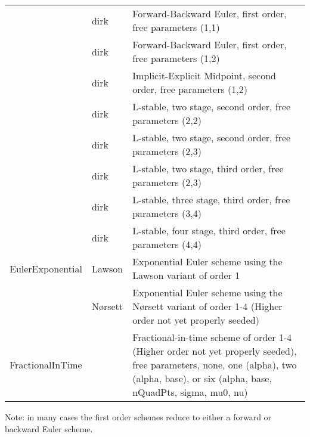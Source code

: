 \begin{center}
\begin{tabular}{p{2.5cm}p{1cm}p{10cm}}
               & dirk & Forward-Backward Euler, first order, free parameters (1,1)\\
               & dirk & Forward-Backward Euler, first order, free parameters (1,2)\\
               & dirk & Implicit-Explicit Midpoint, second order, free parameters (1,2)\\
               & dirk & L-stable, two stage, second order, free parameters (2,2)\\
               & dirk & L-stable, two stage, second order, free parameters (2,3)\\
               & dirk & L-stable, two stage, third order, free parameters (2,3)\\
               & dirk & L-stable, three stage, third order, free parameters (3,4)\\
               & dirk & L-stable, four stage, third order, free parameters (4,4)\\

EulerExponential & Lawson  & Exponential Euler scheme using the
                             Lawson variant of order 1 \\

                 & N{\o}rsett & Exponential Euler scheme using the
                                N{\o}rsett variant of order 1-4
                                (Higher order not yet properly seeded) \\

FractionalInTime &            & Fractional-in-time scheme of order 1-4
                              (Higher order not yet properly seeded),
                              free parameters, none,
                              one (alpha),
                              two (alpha, base), or
                              six (alpha, base, nQuadPts, sigma, mu0, nu) \\
                    
\bottomrule
\end{tabular}
\end{center}

Note: in many cases the first order schemes reduce to either a forward
or backward Euler scheme.

